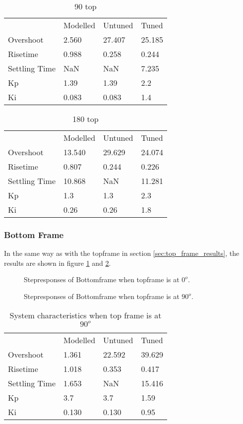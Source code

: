 \documentclass[../../Main]{subfiles}
\begin{document}
\begin{table}[H]
	\centering
	\begin{tabular}{*{4}{l}}
		&Modelled&Untuned&Tuned\\
		Overshoot&2.560&27.407&25.185\\
		Risetime&0.988&0.258&0.244\\
		Settling Time&NaN&NaN&7.235\\
		Kp&1.39&1.39&2.2\\
		Ki&0.083&0.083&1.4
	\end{tabular}
	\caption{90 top}
	\label{tab:90_top}
\end{table}


\begin{table}[H]
	\centering
	\begin{tabular}{*{4}{l}}
		&Modelled&Untuned&Tuned\\
		Overshoot&13.540&29.629&24.074\\
		Risetime&0.807&0.244&0.226\\
		Settling Time&10.868&NaN&11.281\\
		Kp&1.3&1.3&2.3\\
		Ki&0.26&0.26&1.8
	\end{tabular}
	\caption{180 top}
	\label{tab:180_top}
\end{table}



\subsubsection{Bottom Frame}%
\label{sec:bottom_frame_results}

In the same way as with the topframe in section \ref{sec:top_frame_results}, the results are shown in figure \ref{fig:bot_0} and \ref{fig:bot_90}.

\begin{figure}[H]
  \def\svgwidth{\textwidth}
  
  \caption{Stepresponses of Bottomframe when topframe is at $0^o$.}
  \label{fig:bot_0}
\end{figure}

\begin{figure}[H]
 \def\svgwidth{\textwidth}
 
  \caption{Stepresponses of Bottomframe when topframe is at $90^o$.}
  \label{fig:bot_90}
\end{figure}


\begin{table}[H]
	\centering
	\begin{tabular}{*{4}{l}}
		&Modelled&Untuned&Tuned\\
		Overshoot&1.361&22.592&39.629\\
		Risetime& 1.018&0.353&0.417\\
		Settling Time& 1.653&NaN& 15.416\\
		Kp&3.7&3.7&1.59\\
		Ki&0.130&0.130&0.95
	\end{tabular}
	\caption{System characteristics when top frame is at $90^o$}
	\label{tab:90_bot}
\end{table}
\end{document}
